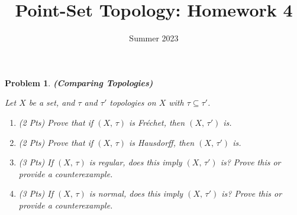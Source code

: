\documentclass{article}
\title{Point-Set Topology: Homework 4}
\date{Summer 2023}
\theoremstyle{normal}
\newtheorem{problem}{Problem}
\begin{document}
    \maketitle
    \begin{problem}
        \textbf{(Comparing Topologies)}
        \par\hfill\par
        Let $X$ be a set, and $\tau$ and $\tau'$ topologies on $X$ with
        $\tau\subseteq\tau'$.
        \begin{enumerate}
            \item (2 Pts) Prove that if $(X,\,\tau)$ is Fr\'{e}chet,
                then $(X,\,\tau')$ is.
            \item (2 Pts) Prove that if $(X,\,\tau)$ is Hausdorff, then
                $(X,\,\tau')$ is.
            \item (3 Pts) If $(X,\,\tau)$ is regular, does this imply
                $(X,\,\tau')$ is? Prove this or provide a counterexample.
            \item (3 Pts) If $(X,\,\tau)$ is normal, does this imply
                $(X,\,\tau')$ is? Prove this or provide a counterexample.
        \end{enumerate}
    \end{problem}
\end{document}
